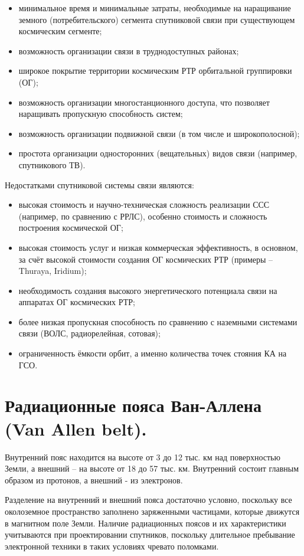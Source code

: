\documentclass[14pt,a4paper,oneside]{extarticle}
\begin{document}
\begin{itemize}
    \item  минимальное время и минимальные затраты, необходимые на наращивание земного (потребительского) сегмента спутниковой связи при существующем космическим сегменте;
    \item возможность организации связи в труднодоступных районах;
    \item широкое покрытие территории космическим РТР орбитальной группировки (ОГ);
    \item возможность организации многостанционного доступа, что позволяет наращивать пропускную способность систем;
    \item возможность организации подвижной связи (в том числе и широкополосной);
    \item простота организации односторонних (вещательных) видов связи (например, спутникового ТВ).
\end{itemize}

Недостатками спутниковой системы связи являются:

\begin{itemize}
    \item высокая стоимость и научно-техническая сложность реализации ССС (например, по сравнению с РРЛС), особенно стоимость и сложность построения космической ОГ;
    \item высокая стоимость услуг и низкая коммерческая эффективность, в основном, за счёт высокой стоимости создания ОГ космических РТР (примеры – Thuraya, Iridium);
    \item необходимость создания высокого энергетического потенциала связи на аппаратах ОГ космических РТР;
    \item более низкая пропускная способность по сравнению с наземными системами связи (ВОЛС, радиорелейная, сотовая);
    \item ограниченность ёмкости орбит, а именно количества точек стояния КА на ГСО.
\end{itemize}

\section{Радиационные пояса Ван-Аллена (Van Allen belt).}

Внутренний пояс находится на высоте от 3 до 12 тыс. км над поверхностью Земли, а внешний – на высоте от 18 до 57 тыс. км. Внутренний состоит главным образом из протонов, а внешний - из электронов.

Разделение на внутренний и внешний пояса достаточно условно, поскольку все околоземное пространство заполнено заряженными частицами, которые движутся в магнитном поле Земли. Наличие радиационных поясов и их характеристики учитываются при проектировании спутников, поскольку длительное пребывание электронной техники в таких условиях чревато поломками.
\end{document}
